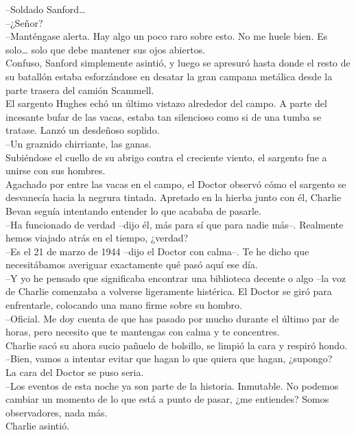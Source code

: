 --Soldado Sanford\ldots{}\\
--¿Señor?\\
--Manténgase alerta. Hay algo un poco raro sobre esto. No me huele bien.
Es solo\ldots{} solo que debe mantener sus ojos abiertos.\\
Confuso, Sanford simplemente asintió, y luego se apresuró hasta donde el
resto de su batallón estaba esforzándose en desatar la gran campana
metálica desde la parte trasera del camión Scammell.\\
El sargento Hughes echó un último vistazo alrededor del campo. A parte
del incesante bufar de las vacas, estaba tan silencioso como si de una
tumba se tratase. Lanzó un desdeñoso soplido.\\
--Un graznido chirriante, las ganas.\\
Subiéndose el cuello de su abrigo contra el creciente viento, el
sargento fue a unirse con sus hombres.\\[2\baselineskip]Agachado por
entre las vacas en el campo, el Doctor observó cómo el sargento se
desvanecía hacia la negrura tintada. Apretado en la hierba junto con él,
Charlie Bevan seguía intentando entender lo que acababa de pasarle.\\
--Ha funcionado de verdad --dijo él, más para sí que para nadie más--.
Realmente hemos viajado atrás en el tiempo, ¿verdad?\\
--Es el 21 de marzo de 1944 --dijo el Doctor con calma--. Te he dicho
que necesitábamos averiguar exactamente qué pasó aquí ese día.\\
--Y yo he pensado que significaba encontrar una biblioteca decente o
algo --la voz de Charlie comenzaba a volverse ligeramente histérica. El
Doctor se giró para enfrentarle, colocando una mano firme sobre su
hombro.\\
--Oficial. Me doy cuenta de que has pasado por mucho durante el último
par de horas, pero necesito que te mantengas con calma y te
concentres.\\
Charlie sacó su ahora sucio pañuelo de bolsillo, se limpió la cara y
respiró hondo.\\
--Bien, vamos a intentar evitar que hagan lo que quiera que hagan,
¿supongo?\\
La cara del Doctor se puso seria.\\
--Los eventos de esta noche ya son parte de la historia. Inmutable. No
podemos cambiar un momento de lo que está a punto de pasar, ¿me
entiendes? Somos observadores, nada más.\\
Charlie asintió.\\
